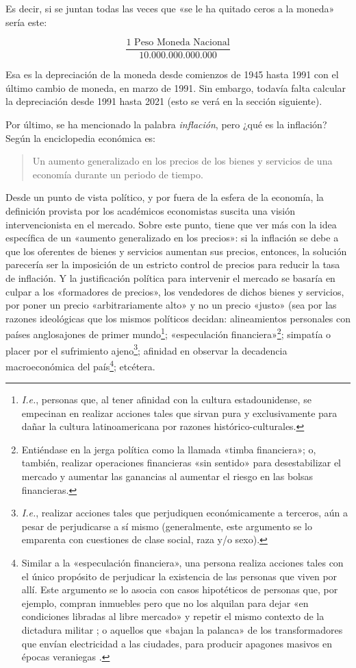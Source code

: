 \documentclass[12pt,a4paper,twoside]{book}
\begin{document}
Es decir, si se juntan todas las veces que «se le ha quitado ceros a la moneda» sería este:

\[
\dfrac{1 \text{ Peso Moneda Nacional}}{10.000.000.000.000}
\]

Esa es la depreciación de la moneda desde comienzos de 1945 hasta 1991 con el último cambio de moneda, en marzo de 1991. Sin embargo, todavía falta calcular la depreciación desde 1991 hasta 2021 (esto se verá en la sección siguiente).

Por último, se ha mencionado la palabra \textit{inflación}, pero ¿qué es la inflación? Según la enciclopedia económica es:

\begin{quote}
Un aumento generalizado en los precios de los bienes y servicios de una economía durante un periodo de tiempo. \cite{epedia:inflac}
\end{quote}

Desde un punto de vista político, y por fuera de la esfera de la economía, la definición provista por los académicos economistas suscita una visión intervencionista en el mercado. Sobre este punto, tiene que ver más con la idea específica de un «aumento generalizado en los precios»: si la inflación se debe a que los oferentes de bienes y servicios aumentan sus precios, entonces, la solución parecería ser la imposición de un estricto control de precios para reducir la tasa de inflación. Y la justificación política para intervenir el mercado se basaría en culpar a los «formadores de precios», los vendedores de dichos bienes y servicios, por poner un precio «arbitrariamente alto» y no un precio «justo» (sea por las razones ideológicas que los mismos políticos decidan: alineamientos personales con países anglosajones de primer mundo\footnote{\textit{I.e.}, personas que, al tener afinidad con la cultura estadounidense, se empecinan en realizar acciones tales que sirvan pura y exclusivamente para dañar la cultura latinoamericana por razones histórico-culturales.}; «especulación financiera»\footnote{Entiéndase en la jerga política como la llamada «timba financiera»; o, también, realizar operaciones financieras «sin sentido» para desestabilizar el mercado y aumentar las ganancias al aumentar el riesgo en las bolsas financieras.}; simpatía o placer por el sufrimiento ajeno\footnote{\textit{I.e.}, realizar acciones tales que perjudiquen económicamente a terceros, aún a pesar de perjudicarse a sí mismo (generalmente, este argumento se lo emparenta con cuestiones de clase social, raza y/o sexo).}; afinidad en observar la decadencia macroeconómica del país\footnote{Similar a la «especulación financiera», una persona realiza acciones tales con el único propósito de perjudicar la existencia de las personas que viven por allí. Este argumento se lo asocia con casos hipotéticos de personas que, por ejemplo, compran inmuebles pero que no los alquilan para dejar «en condiciones libradas al libre mercado» y repetir el mismo contexto de la dictadura militar \cite{vivienda-ociosa}; o aquellos que «bajan la palanca» de los transformadores que envían electricidad a las ciudades, para producir apagones masivos en épocas veraniegas \cite{corte-luz-2012}.}; etcétera.
\end{document}
